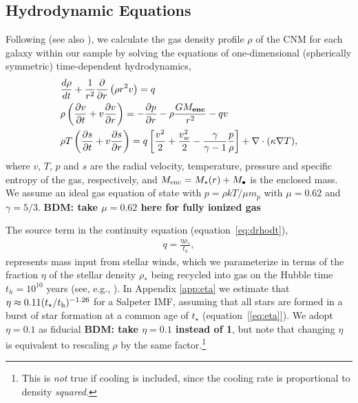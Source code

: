 \documentclass[usenatbib,fleqn]{mn2e}
\newcommand{\dxdy}[2]{\frac{d #1}{d #2} }
\newcommand{\drhodt}{\dxdy{\rho}{t}}
\newcommand{\ke}{\frac{v^2}{2}}
\newcommand{\kew}{\frac{v_w^2}{2}}
\newcommand{\gammaf}{\frac{\gamma}{\gamma-1}}
\newcommand{\cs}{\frac{p}{\rho}}
\newcommand{\rhostar}{\rho_*}
\newcommand{\Mbh}[1][]{M_{\bullet#1}}
\renewcommand{\th}{t_h}
\begin{document}


\subsection{Hydrodynamic Equations}
\label{sec:hydro}

Following \citet{Quataert:2004a} (see also \citealt{HolzerAxford:1970a,De-ColleGuillochon+:2012a,ShcherbakovWong+:2014a}), we calculate the gas density profile $\rho$ of the CNM for each galaxy within our sample by solving the equations of one-dimensional (spherically symmetric) time-dependent hydrodynamics,
\begin{align}
  &\drhodt+\frac{1}{r^2}\frac{\partial}{\partial r}\left(\rho r^2 v\right)=q \label{eq:drhodt}\\
  &\rho \left(\frac{\partial v}{\partial t} + v\frac{\partial
      v}{\partial r}\right) =-\frac{\partial p}{\partial r}- \rho\frac{GM_{\bf enc}}{r^{2}} -q v \label{eq:dvdt}\\
  &\rho T\left(\frac{\partial s}{\partial t} + v\frac{\partial
      s}{\partial r}\right)=q\left[\ke+\kew-\gammaf \cs \right] +\nabla\cdot(\kappa \nabla T)
, 
\label{eq:dsdt}
\end{align}
where $v$, $T$, $p$ and $s$ are the radial velocity, temperature,
pressure and specific entropy of the gas, respectively, and $M_{\rm enc} = M_{\star}(r) + \Mbh$ is the
enclosed mass.  We assume an ideal gas equation of state with $p =
\rho kT/\mu m_p$ with $\mu = 0.62$  and $\gamma = 5/3$. {\bf BDM: take $\mu = 0.62$ here for fully ionized gas}

The source term in the continuity equation (equation~\ref{eq:drhodt}),
\begin{align}
  q=\frac{\eta \rhostar}{\th},
\label{eq:q}
\end{align}
represents mass input from stellar winds, which we parameterize in
terms of the fraction $\eta$ of the stellar density $\rhostar$ being
recycled into gas on the Hubble time $\th = 10^{10}$ years (see, e.g.,
\citealt{Ciotti+91}).  In Appendix \ref{app:eta} we estimate that
$\eta \approx 0.11(t_{\star}/t_{\rm h})^{-1.26}$ for a Salpeter IMF,
assuming that all stars are formed in a burst of star formation at a
common age of $t_{\star}$ (equation~[\ref{eq:eta}]).  We adopt
$\eta=0.1$ as fiducial {\bf BDM: take $\eta = 0.1$ instead of 1}, but note that changing $\eta$ is equivalent to
rescaling $\rho$ by the same factor.\footnote{This is {\it not} true
  if cooling is included, since the cooling rate is proportional to
  density {\it squared}.}
\end{document}

